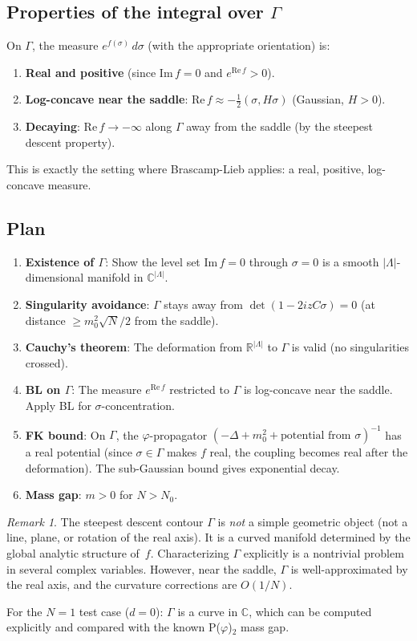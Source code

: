 \documentclass[12pt]{article}
\theoremstyle{definition}
\theoremstyle{remark}
\newtheorem{remark}[theorem]{Remark}
\newcommand{\R}{\mathbb{R}}
\newcommand{\C}{\mathbb{C}}
\newcommand{\ph}{\varphi}
\newcommand{\La}{\Lambda}
\begin{document}
\subsection{Properties of the integral over $\Gamma$}

On $\Gamma$, the measure $e^{f(\sigma)}\,d\sigma$ (with the
appropriate orientation) is:
\begin{enumerate}
\item \textbf{Real and positive} (since $\mathrm{Im}\,f = 0$
  and $e^{\mathrm{Re}\,f} > 0$).
\item \textbf{Log-concave near the saddle}: $\mathrm{Re}\,f
  \approx -\tfrac{1}{2}(\sigma,H\sigma)$ (Gaussian, $H > 0$).
\item \textbf{Decaying}: $\mathrm{Re}\,f \to -\infty$ along
  $\Gamma$ away from the saddle (by the steepest descent property).
\end{enumerate}
This is exactly the setting where Brascamp-Lieb applies: a real,
positive, log-concave measure.

\subsection{Plan}

\begin{enumerate}
\item \textbf{Existence of $\Gamma$}: Show the level set
  $\mathrm{Im}\,f = 0$ through $\sigma = 0$ is a smooth
  $|\La|$-dimensional manifold in $\C^{|\La|}$.
\item \textbf{Singularity avoidance}: $\Gamma$ stays away from
  $\det(1-2izC\sigma) = 0$ (at distance $\ge m_0^2\sqrt{N}/2$
  from the saddle).
\item \textbf{Cauchy's theorem}: The deformation from $\R^{|\La|}$
  to $\Gamma$ is valid (no singularities crossed).
\item \textbf{BL on $\Gamma$}: The measure $e^{\mathrm{Re}\,f}$
  restricted to $\Gamma$ is log-concave near the saddle. Apply
  BL for $\sigma$-concentration.
\item \textbf{FK bound}: On $\Gamma$, the $\ph$-propagator
  $(-\Delta + m_0^2 + \text{potential from }\sigma)^{-1}$ has a
  real potential (since $\sigma \in \Gamma$ makes $f$ real, the
  coupling becomes real after the deformation). The sub-Gaussian
  bound gives exponential decay.
\item \textbf{Mass gap}: $m > 0$ for $N > N_0$.
\end{enumerate}

\begin{remark}
The steepest descent contour $\Gamma$ is \emph{not} a simple
geometric object (not a line, plane, or rotation of the real axis).
It is a curved manifold determined by the global analytic structure
of~$f$. Characterizing $\Gamma$ explicitly is a nontrivial problem
in several complex variables. However, near the saddle, $\Gamma$
is well-approximated by the real axis, and the curvature corrections
are $O(1/N)$.

For the $N = 1$ test case ($d = 0$): $\Gamma$ is a curve in $\C$,
which can be computed explicitly and compared with the known
P($\ph$)$_2$ mass gap.
\end{remark}
\end{document}
